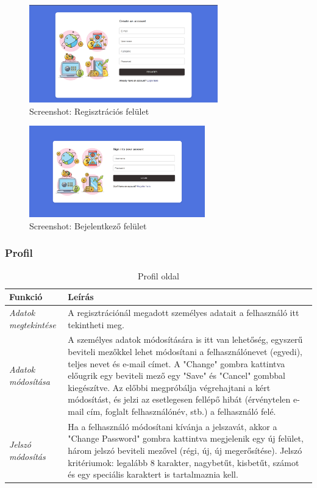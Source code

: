 \begin{figure}[H]
	\centering
	\includegraphics[height=160px]{img/register}
	\caption{Screenshot: Regisztrációs felület}
	\label{fig:register}
\end{figure}

\begin{figure}[H]
	\centering
	\includegraphics[height=150px]{img/login}
	\caption{Screenshot: Bejelentkező felület}
	\label{fig:login}
\end{figure}

\subsubsection{Profil}
\begin{table}[H]
	\centering
	\begin{tabular}{ | m{} | m{} | }
		\hline
		\textbf{Funkció} & \textbf{Leírás} \\
		\hline \hline
		\emph{Adatok megtekintése} & A regisztrációnál megadott személyes adatait a felhasználó itt tekintheti meg. \\
		\hline
		\emph{Adatok módosítása} &  A személyes adatok módosítására is itt van lehetőség, egyszerű beviteli mezőkkel lehet módosítani a felhasználónevet (egyedi), teljes nevet és e-mail címet. A "Change" gombra kattintva előugrik egy beviteli mező egy "Save" és "Cancel" gombbal kiegészítve. Az előbbi megpróbálja végrehajtani a kért módosítást, és jelzi az esetlegesen fellépő hibát (érvénytelen e-mail cím, foglalt felhasználónév, stb.) a felhasználó felé.  \\
		\hline
		\emph{Jelszó módosítás} & Ha a felhasználó módosítani kívánja a jelszavát, akkor a "Change Password" gombra kattintva megjelenik egy új felület, három jelszó beviteli mezővel (régi, új, új megerősítése). Jelszó kritériumok: legalább 8 karakter, nagybetűt, kisbetűt, számot és egy speciális karaktert is tartalmaznia kell. \\
		\hline
	\end{tabular}
	\caption{Profil oldal}
	\label{tab:profile}
\end{table}

